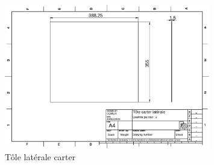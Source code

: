 \documentclass[a4paper]{article}
\begin{document}
\begin{figure}[H]
    \centering
    \includegraphics*[width=0.8\textwidth]{../plans/tole-carter-laterale}
    \caption{Tôle latérale carter}
    \label{fig:tole-carter-laterale}
\end{figure}
\end{document}
